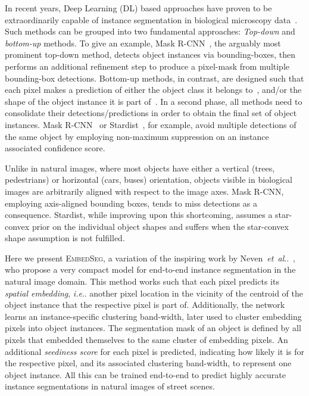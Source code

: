 \documentclass{midl}
\makeatletter
\newcommand{\EmbedSeg}{\mbox{\textsc{EmbedSeg}}\xspace}
\DeclareRobustCommand\onedot{\futurelet\@let@token\@onedot}
\def\@onedot{\ifx\@let@token.\else.\null\fi\xspace}
\def\ie{\emph{i.e}\onedot} \def\Ie{\emph{I.e}\onedot}
\def\etal{\emph{et~al}\onedot}
\makeatother
\begin{document}
In recent years, Deep Learning (DL) based approaches have proven to be extraordinarily capable of instance segmentation in biological microscopy data~\cite{moen2019, caicedo2019_v2}.
Such methods can be grouped into two fundamental approaches: \textit{Top-down} and \textit{bottom-up} methods. 
To give an example, Mask R-CNN~\cite{he2017}, the arguably most prominent top-down method, detects object instances via bounding-boxes, then performs an additional refinement step to produce a pixel-mask from multiple bounding-box detections.
Bottom-up methods, in contrast, are designed such that each pixel makes a prediction of either the object class it belongs to~\cite{ronneberger2015}, and/or the shape of the object instance it is part of~\cite{schmidt2018,neven2019,hirsch2020}. 
In a second phase, all methods need to consolidate their detections/predictions in order to obtain the final set of object instances.
Mask R-CNN~\cite{he2017} or Stardist~\cite{schmidt2018}, for example, avoid multiple detections of the same object by employing non-maximum suppression on an instance associated confidence score. 

Unlike in natural images, where most objects have either a vertical (trees, pedestrians) or horizontal (cars, buses) orientation, objects visible in biological images are arbitrarily aligned with respect to the image axes. Mask R-CNN, employing axis-aligned bounding boxes, tends to miss detections as a consequence. Stardist, while improving upon this shortcoming, assumes a star-convex prior on the individual object shapes and suffers when the star-convex shape assumption is not fulfilled. 
\figQualitative

Here we present \EmbedSeg, a variation of the inspiring work by Neven~\etal~\cite{neven2019}, who propose a very compact model for end-to-end instance segmentation in the natural image domain.
This method works such that each pixel predicts its \textit{spatial embedding}, \ie another pixel location in the vicinity of the centroid of the object instance that the respective pixel is part of. 
Additionally, the network learns an instance-specific clustering band-width, later used to cluster embedding pixels into object instances. 
The segmentation mask of an object is defined by all pixels that embedded themselves to the same cluster of embedding pixels.
An additional \textit{seediness score} for each pixel is predicted, indicating how likely it is for the respective pixel, and its associated clustering band-width, to represent one object instance. 
All this can be trained end-to-end to predict highly accurate instance segmentations in natural images of street scenes.
\end{document}
